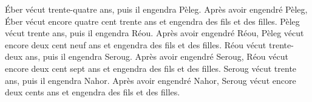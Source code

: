 Éber vécut trente-quatre ans, puis il engendra Pèleg.
Après avoir engendré Pèleg, Éber vécut encore quatre cent trente ans
	et engendra des fils et des filles.
Pèleg vécut trente ans, puis il engendra Réou.
Après avoir engendré Réou, Pèleg vécut encore deux cent neuf ans
	et engendra des fils et des filles.
Réou vécut trente-deux ans, puis il engendra Seroug.
Après avoir engendré Seroug, Réou vécut encore deux cent sept ans
	et engendra des fils et des filles.
Seroug vécut trente ans, puis il engendra Nahor.
Après avoir engendré Nahor, Seroug vécut encore deux cents ans
	et engendra des fils et des filles.
